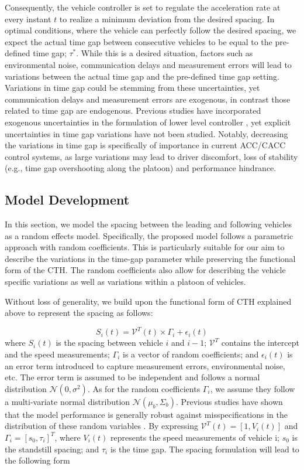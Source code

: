 \documentclass{article}
\begin{document}
Consequently, the vehicle controller is set to regulate the acceleration rate at every instant $t$ to realize a minimum deviation from the desired spacing. In optimal conditions, where the vehicle can perfectly follow the desired spacing, we expect the actual time gap between consecutive vehicles to be equal to the pre-defined time gap; $\tau^*$. While this is a desired situation, factors such as environmental noise, communication delays and measurement errors will lead to variations between the actual time gap and the pre-defined time gap setting. Variations in time gap could be stemming from these uncertainties, yet communication delays and measurement errors are exogenous, in contrast those related to time gap are endogenous. Previous studies have incorporated exogenous uncertainties in the formulation of lower level controller \cite{wang2018delay,wang2014rolling}, yet explicit uncertainties in time gap variations have not been studied. Notably, decreasing the variations in time gap is specifically of importance in current ACC/CACC control systems, as large variations may lead to driver discomfort, loss of stability (e.g., time gap overshooting along the platoon) and performance hindrance.

\subsection{Model Development}

In this section, we model the spacing between the leading and following vehicles as a random effects model. Specifically, the proposed model follows a parametric approach with random coefficients. This is particularly suitable for our aim to describe the variations in the time-gap parameter while preserving the functional form of the CTH. The random coefficients also allow for describing the vehicle specific variations as well as variations within a platoon of vehicles. 

Without loss of generality, we build upon the functional form of CTH explained above to represent the spacing as follows:

\begin{equation}
    S_i(t) = \mathcal{V}^T(t) \times \Gamma_i + \epsilon_i(t)
\end{equation}
where $S_i(t)$ is the spacing between vehicle $i$ and $i-1$; $\mathcal{V}^T$ contains the intercept and the speed measurements; $\Gamma_i$ is a vector of random coefficients; and $\epsilon_i(t)$ is an error term introduced to capture measurement errors, environmental noise, etc. The error term is assumed to be independent and follows a normal distribution $\mathcal{N}(0,\sigma^2)$. As for the random coefficients $\Gamma_i$, we assume they follow a multi-variate normal distribution $\mathcal{N}(\mu_b,\Sigma_b)$. Previous studies have shown that the model performance is generally robust against misspecifications in the distribution of these random variables \cite{hsieh2006joint,elwany2009real}. By expressing $\mathcal{V}^T(t) = [1,V_i(t)]$ and $\Gamma_i = [s_0, \tau_i]^T$, where $V_i(t)$ represents the speed measurements of vehicle i; $s_0$ is the standstill spacing; and $\tau_i$ is the time gap. The spacing formulation will lead to the following form
\end{document}
